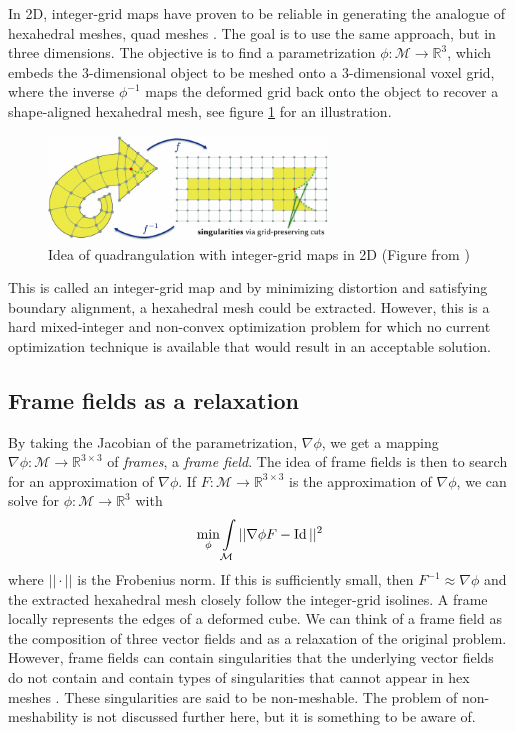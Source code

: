 \documentclass[../thesis.tex]{subfiles}
\begin{document}
In 2D, integer-grid maps have proven to be reliable
in generating the analogue of hexahedral meshes, quad meshes \cite{integer-grid}.
The goal is to use the same approach, but in three dimensions.
The objective is to find a parametrization
$\phi : \mathcal{M} \to \mathbb{R}^3$, which embeds the $3$-dimensional object
to be meshed
onto a $3$-dimensional voxel grid, where the inverse $\phi^{-1}$ maps the deformed
grid back onto the object to recover a shape-aligned hexahedral mesh, see figure \ref{fig:integer-grid} for an illustration.
\begin{figure}[htb]
  \centering
  \includegraphics[width=20em]{figures/integer-grid-rough}
  \caption{Idea of quadrangulation with integer-grid maps in 2D (Figure from \cite{Hex22})}
  \label{fig:integer-grid}
\end{figure}
This is called an integer-grid map and by minimizing distortion and satisfying boundary alignment,
a hexahedral mesh could be extracted.
However, this is a hard mixed-integer and non-convex optimization problem for which no current
optimization technique is available that would result in an acceptable solution.

\subsection{Frame fields as a relaxation}
By taking the Jacobian of the parametrization, $\nabla \phi$, we get a mapping
$\nabla \phi : \mathcal{M} \to \mathbb{R}^{3\times3}$ of \emph{frames}, a \emph{frame field}.
The idea of frame fields is then to search for an approximation of $\nabla \phi$.
If $F: \mathcal{M} \to \mathbb{R}^{3\times3}$ is the approximation of $\nabla \phi$, we can
solve for $\phi : \mathcal{M} \to \mathbb{R}^3$ with
$$\min \limits_{\phi} \int \limits_{\mathcal{M}} ||\nabla \phi F - \operatorname{Id}||^2$$
where $||\cdot||$ is the Frobenius norm. If this is sufficiently small, then $F^{-1} \approx \nabla \phi$ and 
the extracted hexahedral mesh closely follow the integer-grid isolines.
A frame locally represents the edges of a deformed cube.
We can think of a frame field as the composition of three vector fields
and as a relaxation of the original problem. However, frame fields
can contain singularities that the underlying vector fields do not contain \cite{Nieser}
and contain types of singularities that cannot appear in hex meshes \cite{Liu}.
These singularities are said to be non-meshable.
The problem of non-meshability is not discussed further here, but it
is something to be aware of.
\end{document}
